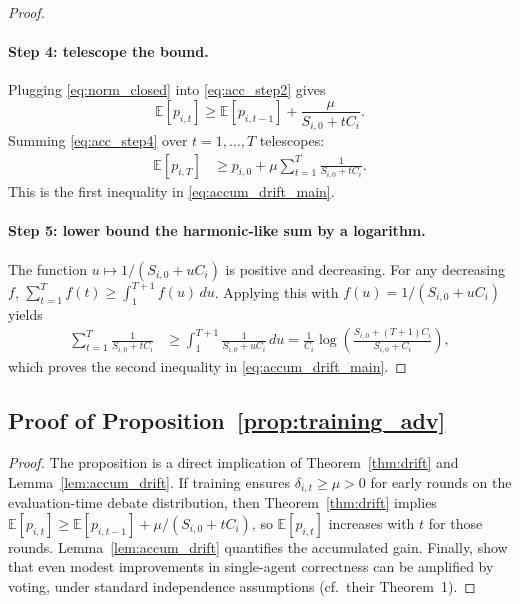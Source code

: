 \begin{proof}
\paragraph{Step 4: telescope the bound.}
Plugging \eqref{eq:norm_closed} into \eqref{eq:acc_step2} gives
\begin{equation}
\mathbb{E}[p_{i,t}] \ge \mathbb{E}[p_{i,t-1}] + \frac{\mu}{S_{i,0}+tC_i}.
\label{eq:acc_step4}
\end{equation}
Summing \eqref{eq:acc_step4} over \(t=1,\dots,T\) telescopes:
\begin{align}
\mathbb{E}[p_{i,T}]
&\ge p_{i,0} + \mu\sum_{t=1}^{T}\frac{1}{S_{i,0}+tC_i}.
\label{eq:acc_telescope}
\end{align}
This is the first inequality in \eqref{eq:accum_drift_main}.

\paragraph{Step 5: lower bound the harmonic-like sum by a logarithm.}
The function \(u\mapsto 1/(S_{i,0}+uC_i)\) is positive and decreasing.
For any decreasing \(f\), \(\sum_{t=1}^{T} f(t)\ge \int_{1}^{T+1} f(u)\,du\).
Applying this with \(f(u)=1/(S_{i,0}+uC_i)\) yields
\begin{align}
\sum_{t=1}^{T}\frac{1}{S_{i,0}+tC_i}
&\ge \int_{1}^{T+1}\frac{1}{S_{i,0}+uC_i}\,du
= \frac{1}{C_i}\log\!\left(\frac{S_{i,0}+(T+1)C_i}{S_{i,0}+C_i}\right),
\label{eq:log_bound}
\end{align}
which proves the second inequality in \eqref{eq:accum_drift_main}.
\end{proof}

\subsection{Proof of Proposition~\ref{prop:training_adv}}
\label{app:proof_prop}

\begin{proof}
The proposition is a direct implication of Theorem~\ref{thm:drift} and Lemma~\ref{lem:accum_drift}.
If training ensures \(\delta_{i,t}\ge\mu>0\) for early rounds on the evaluation-time debate distribution,
then Theorem~\ref{thm:drift} implies
\(\mathbb{E}[p_{i,t}] \ge \mathbb{E}[p_{i,t-1}] + \mu/(S_{i,0}+tC_i)\),
so \(\mathbb{E}[p_{i,t}]\) increases with \(t\) for those rounds.
Lemma~\ref{lem:accum_drift} quantifies the accumulated gain.
Finally, \citet{choi2025debate} show that even modest improvements in single-agent correctness can be amplified by voting,
under standard independence assumptions (cf.\ their Theorem~1).
\end{proof}


